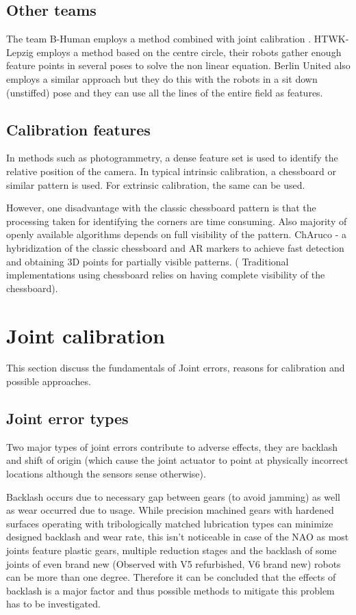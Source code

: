 \documentclass[english, printversion, nomenclature, notitle]{tuvisionthesis} %
\begin{document}
\subsection{Other teams}
The team B-Human employs a method combined with joint calibration . HTWK-Lepzig employs a method based on the centre circle, their robots gather enough feature points in several poses to solve the non linear equation. Berlin United also employs a similar approach but they do this with the robots in a sit down (unstiffed) pose and they can use all the lines of the entire field as features.

\subsection{Calibration features}

In methods such as photogrammetry, a dense feature set is used to identify the relative position of the camera. In typical intrinsic calibration, a chessboard or similar pattern is used. For extrinsic calibration, the same can be used.

However, one disadvantage with the classic chessboard pattern is that the processing taken for identifying the corners are time consuming. Also majority of openly available algorithms depends on full visibility of the pattern.
ChAruco - a hybridization of the classic chessboard and AR markers to achieve fast detection and obtaining 3D points for partially visible patterns. ( Traditional implementations using chessboard relies on having complete visibility of the chessboard).

\section{Joint calibration}
This section discuss the fundamentals of Joint errors, reasons for calibration and possible approaches.

\subsection{Joint error types}
Two major types of joint errors contribute to adverse effects, they are backlash and shift of origin (which cause the joint actuator to point at physically incorrect locations although the sensors sense otherwise).

Backlash occurs due to necessary gap between gears (to avoid jamming) as well as wear occurred due to usage. While precision machined gears with hardened surfaces operating with tribologically matched lubrication types can minimize designed backlash and wear rate, this isn't noticeable in case of the NAO as most joints feature plastic gears, multiple reduction stages and the backlash of some joints of even brand new (Observed with V5 refurbished, V6 brand new) robots can be more than one degree. Therefore it can be concluded that the effects of backlash is a major factor and thus possible methods to mitigate this problem has to be investigated.
\end{document}
